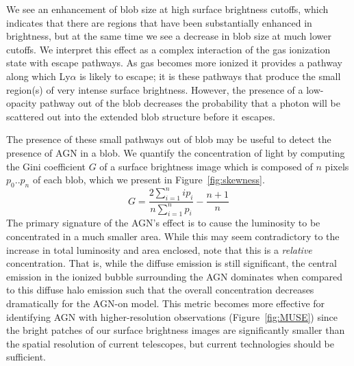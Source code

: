 We see an enhancement of blob size at high surface brightness cutoffs, which indicates that there are regions that have been substantially enhanced in brightness, but at the same time we see a decrease in blob size at much lower cutoffs.
We interpret this effect as a complex interaction of the gas ionization state with escape pathways.
As gas becomes more ionized it provides a pathway along which Ly$\alpha$ is likely to escape; it is these pathways that produce the small region(s) of very intense surface brightness.
However, the presence of a low-opacity pathway out of the blob decreases the probability that a photon will be scattered out into the extended blob structure before it escapes.

The presence of these small pathways out of blob may be useful to detect the presence of AGN in a blob.
We quantify the concentration of light by computing the Gini coefficient $G$ of a surface brightness image which is composed of $n$ pixels $p_{0}..p_{n}$ of each blob, which we present in Figure~\ref{fig:skewness}.
\begin{equation}
    \label{eq:gini}
    G = \frac{2\sum_{i=1}^{n}i p_{i}}{n\sum_{i=1}^{n}p_{i}} - \frac{n+1}{n}
\end{equation}
The primary signature of the AGN's effect is to cause the luminosity to be concentrated in a much smaller area.
While this may seem contradictory to the increase in total luminosity and area enclosed, note that this is a {\it relative} concentration.
That is, while the diffuse emission is still significant, the central emission in the ionized bubble surrounding the AGN dominates when compared to this diffuse halo emission such that the overall concentration decreases dramatically for the AGN-on model.
This metric becomes more effective for identifying AGN with higher-resolution observations (Figure~\ref{fig:MUSE}) since the bright patches of our surface brightness images are significantly smaller than the spatial resolution of current telescopes, but current technologies should be sufficient.

